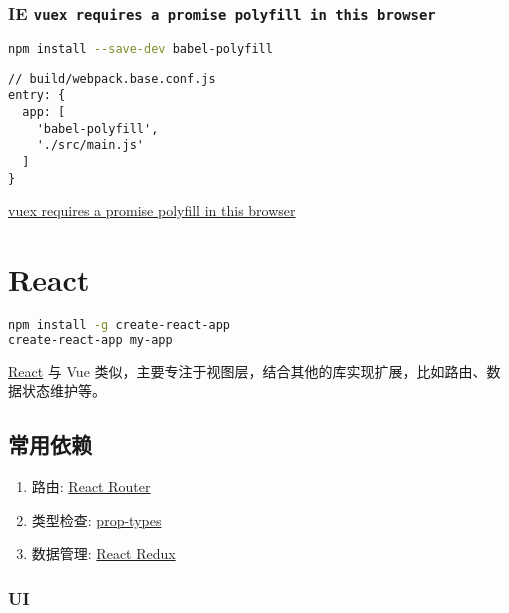 \subsubsection{\texorpdfstring{IE
\texttt{vuex\ requires\ a\ promise\ polyfill\ in\ this\ browser}}{IE vuex requires a promise polyfill in this browser}}\label{ie-vuex-requires-a-promise-polyfill-in-this-browser}

\begin{lstlisting}[language=bash]
npm install --save-dev babel-polyfill
\end{lstlisting}

\begin{lstlisting}
// build/webpack.base.conf.js
entry: {
  app: [
    'babel-polyfill',
    './src/main.js'
  ]
}
\end{lstlisting}

\href{https://github.com/vuejs-templates/webpack/issues/474}{vuex
requires a promise polyfill in this browser}

\section{React}\label{react}

\begin{lstlisting}[language=bash]
npm install -g create-react-app
create-react-app my-app
\end{lstlisting}

\href{https://reactjs.org/}{React} 与 Vue
类似，主要专注于视图层，结合其他的库实现扩展，比如路由、数据状态维护等。

\subsection{常用依赖}\label{ux5e38ux7528ux4f9dux8d56}

\begin{enumerate}
\def\labelenumi{\arabic{enumi}.}
\tightlist
\item
  路由: \href{https://github.com/ReactTraining/react-router}{React
  Router}
\item
  类型检查: \href{https://github.com/facebook/prop-types}{prop-types}
\item
  数据管理: \href{https://github.com/reactjs/react-redux}{React Redux}
\end{enumerate}

\subsubsection{UI}\label{ui}

